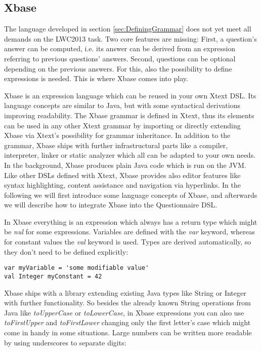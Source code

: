 \subsection{Xbase}

The language developed in section \ref{sec:DefiningGrammar} does not yet meet all 
demands on the LWC2013 task. Two core features are missing: First, a question's 
answer can be computed, i.e. its answer can be derived from an expression referring 
to previous questions' answers. Second, questions can be optional depending on the 
previous answers. For this, also the possibility to define expressions is needed. This
is where Xbase comes into play.

Xbase is an expression language which can be reused in your own Xtext DSL. Its language
concepts are similar to Java, but with some syntactical derivations improving readability.
The Xbase grammar is defined in Xtext, thus its elements can be used in any other Xtext grammar
by importing or directly extending Xbase via Xtext's possibility for grammar inheritance.
In addition to the grammar, Xbase ships with further infrastructural parts like a compiler, 
interpreter, linker or static analyzer which all can be adapted to your own needs. In
the background, Xbase produces plain Java code which is run on the JVM. Like
other DSLs defined with Xtext, Xbase provides also editor features like syntax highlighting, 
content assistance and navigation via hyperlinks. In the following we will first introduce
some language concepts of Xbase, and afterwards we will describe how to integrate Xbase
into the Questionnaire DSL.

In Xbase everything is an expression which always has a return type which might be \emph{nul} 
for some expressions. Variables are defined with the \emph{var} keyword, whereas for 
constant values the \emph{val} keyword is used. Types are derived automatically, so they 
don't need to be defined explicitly:

\begin{lstlisting}[language=Xbase]
var myVariable = 'some modifiable value'
val Integer myConstant = 42  
\end{lstlisting}

Xbase ships with a library extending existing Java types like String or Integer with further 
functionality. So besides the already known String operations from Java like 
\emph{toUpperCase} or \emph{toLowerCase}, in Xbase expressions you can also use \emph{toFirstUpper}
and \emph{toFirstLower} changing only the first letter's case which might come in handy 
in some situations. Large numbers can be written more readable by using underscores to
separate digits:

